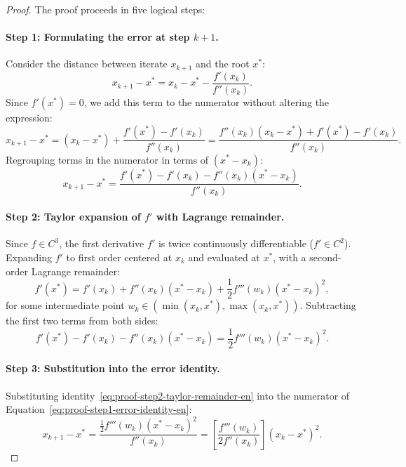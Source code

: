 \begin{proof}
The proof proceeds in five logical steps:

\paragraph{Step 1: Formulating the error at step $k+1$.}
Consider the distance between iterate $x_{k+1}$ and the root $x^*$:
\begin{equation}
    x_{k+1} - x^* = x_k - x^* - \frac{f'(x_k)}{f''(x_k)}.
\end{equation}
Since $f'(x^*) = 0$, we add this term to the numerator without altering the expression:
\begin{equation}
    x_{k+1} - x^* = (x_k - x^*) + \frac{f'(x^*) - f'(x_k)}{f''(x_k)} = \frac{f''(x_k)(x_k - x^*) + f'(x^*) - f'(x_k)}{f''(x_k)}.
\end{equation}
Regrouping terms in the numerator in terms of $(x^* - x_k)$:
\begin{equation}
    x_{k+1} - x^* = \frac{f'(x^*) - f'(x_k) - f''(x_k)(x^* - x_k)}{f''(x_k)}.
    \label{eq:proof-step1-error-identity-en}
\end{equation}

\paragraph{Step 2: Taylor expansion of $f'$ with Lagrange remainder.}
Since $f \in C^3$, the first derivative $f'$ is twice continuously differentiable ($f' \in C^2$). Expanding $f'$ to first order centered at $x_k$ and evaluated at $x^*$, with a second-order Lagrange remainder:
\begin{equation}
    f'(x^*) = f'(x_k) + f''(x_k)(x^* - x_k) + \frac{1}{2} f'''(w_k) (x^* - x_k)^2,
\end{equation}
for some intermediate point $w_k \in ( \min(x_k, x^*), \max(x_k, x^*) )$.
Subtracting the first two terms from both sides:
\begin{equation}
    f'(x^*) - f'(x_k) - f''(x_k)(x^* - x_k) = \frac{1}{2} f'''(w_k) (x^* - x_k)^2.
    \label{eq:proof-step2-taylor-remainder-en}
\end{equation}

\paragraph{Step 3: Substitution into the error identity.}
Substituting identity~\eqref{eq:proof-step2-taylor-remainder-en} into the numerator of Equation~\eqref{eq:proof-step1-error-identity-en}:
\begin{equation}
    x_{k+1} - x^* = \frac{\frac{1}{2} f'''(w_k) (x^* - x_k)^2}{f''(x_k)} = \left[ \frac{f'''(w_k)}{2 f''(x_k)} \right] (x_k - x^*)^2.
    \label{eq:proof-step3-bracketed-relation-en}
\end{equation}


\end{proof}
